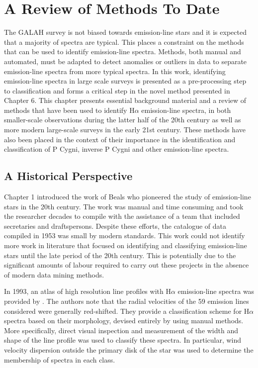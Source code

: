 \chapter{A Review of Methods To Date}

The GALAH survey is not biased towards emission-line stars and it is expected that a majority of spectra are typical. This places a constraint on the methods that can be used to identify emission-line spectra. Methods, both manual and automated, must be adapted to detect anomalies or outliers in data to separate emission-line spectra from more typical spectra. In this work, identifying emission-line spectra in large scale surveys is presented as a pre-processing step to classification and forms a critical step in the novel method presented in Chapter 6. This chapter presents essential background material and a review of methods that have been used to identify H$\alpha$ emission-line spectra, in both smaller-scale observations during the latter half of the 20th century as well as more modern large-scale surveys in the early 21st century. These methods have also been placed in the context of their importance in the identification and classification of P Cygni, inverse P Cygni and other emission-line spectra.

\section{A Historical Perspective}
Chapter 1 introduced the work of Beals who pioneered the study of emission-line stars in the 20th century. The work was manual and time consuming and took the researcher decades to compile with the assistance of a team that included secretaries and draftspersons. Despite these efforts, the catalogue of data compiled in 1953 was small by modern standards. This work could not identify more work in literature that focused on identifying and classifying emission-line stars until the late period of the 20th century. This is potentially due to the significant amounts of labour required to carry out these projects in the absence of modern data mining methods. 

In 1993, an atlas of high resolution line profiles with H$\alpha$ emission-line spectra was provided by \citet{van1993atlas}. The authors note that the radial velocities of the 59 emission lines considered were generally red-shifted. They provide a classification scheme for H$\alpha$ spectra based on their morphology, devised entirely by using manual methods. More specifically, direct visual inspection and measurement of the width and shape of the line profile was used to classify these spectra. In particular, wind velocity dispersion outside the primary disk of the star was used to determine the membership of spectra in each class.

